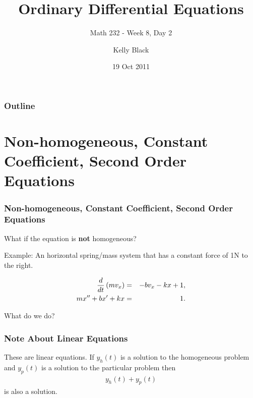 
\title{Ordinary Differential Equations}
\subtitle{Math 232 - Week 8, Day 2}

\author{Kelly Black}
\date{19 Oct 2011}

\begin{frame}
  \titlepage
\end{frame}

\begin{frame}
  \frametitle{Outline}
\end{frame}


\section{Non-homogeneous, Constant Coefficient, Second Order Equations}


\begin{frame}
  \frametitle{Non-homogeneous, Constant Coefficient, Second Order
    Equations}
  What if the equation is \textbf{not} homogeneous?

  Example: An horizontal spring/mass system that has a constant force
  of 1N to the right.

  \begin{eqnarray*}
    \frac{d}{dt} \left( m v_x \right) & = & -b v_x - kx + 1, \\
    m x'' + bx' + kx & = & 1.
  \end{eqnarray*}

  What do we do?


\end{frame}


\begin{frame}
  \frametitle{Note About Linear Equations}

  These are linear equations. If $y_h(t)$ is a solution to the
  homogeneous problem and $y_p(t)$ is a solution to the particular
  problem then
  \begin{eqnarray*}
    y_h(t) + y_p(t)
  \end{eqnarray*}
  is also a solution.

\end{frame}


